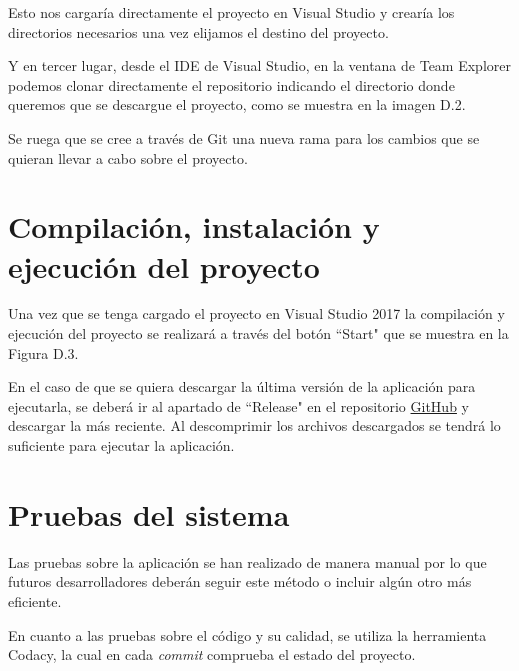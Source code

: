 
Esto nos cargaría directamente el proyecto en Visual Studio y crearía los directorios necesarios una vez elijamos el destino del proyecto.

Y en tercer lugar, desde el IDE de Visual Studio, en la ventana de Team Explorer podemos clonar directamente el repositorio indicando el directorio donde queremos que se descargue el proyecto, como se muestra en la imagen D.2.


Se ruega que se cree a través de Git una nueva rama para los cambios que se quieran llevar a cabo sobre el proyecto.

\section{Compilación, instalación y ejecución del proyecto}

Una vez que se tenga cargado el proyecto en Visual Studio 2017 la compilación y ejecución del proyecto se realizará a través del botón ``Start" que se muestra en la Figura D.3.


En el caso de que se quiera descargar la última versión de la aplicación para ejecutarla, se deberá ir al apartado de ``Release" en el repositorio \href{https://github.com/FranBurgos/TFG/releases}{GitHub} y descargar la más reciente. Al descomprimir los archivos descargados se tendrá lo suficiente para ejecutar la aplicación.

\section{Pruebas del sistema}

Las pruebas sobre la aplicación se han realizado de manera manual por lo que futuros desarrolladores deberán seguir este método o incluir algún otro más eficiente.

En cuanto a las pruebas sobre el código y su calidad, se utiliza la herramienta Codacy, la cual en cada \textit{commit} comprueba el estado del proyecto.
